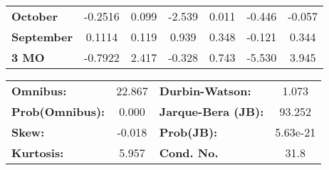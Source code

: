 \begin{center}
\begin{tabular}{lcccccc}
\textbf{October}   &      -0.2516  &        0.099     &    -2.539  &         0.011        &       -0.446    &       -0.057     \\
\textbf{September} &       0.1114  &        0.119     &     0.939  &         0.348        &       -0.121    &        0.344     \\
\textbf{3 MO}      &      -0.7922  &        2.417     &    -0.328  &         0.743        &       -5.530    &        3.945     \\
\bottomrule
\end{tabular}
\begin{tabular}{lclc}
\textbf{Omnibus:}       & 22.867 & \textbf{  Durbin-Watson:     } &    1.073  \\
\textbf{Prob(Omnibus):} &  0.000 & \textbf{  Jarque-Bera (JB):  } &   93.252  \\
\textbf{Skew:}          & -0.018 & \textbf{  Prob(JB):          } & 5.63e-21  \\
\textbf{Kurtosis:}      &  5.957 & \textbf{  Cond. No.          } &     31.8  \\
\bottomrule
\end{tabular}
\end{center}


